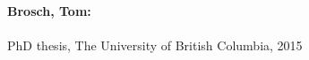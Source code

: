 \begin{quotation}
% 
% 
% 
\end{quotation}
\vfill
\noindent
\textbf{Brosch, Tom:}\\
\emph{\longtitle}\\
PhD thesis, The University of British Columbia, 2015